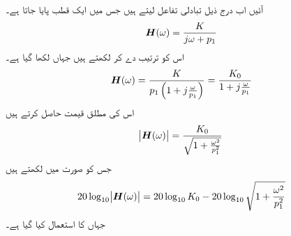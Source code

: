 آئیں اب درج ذیل تبادلی تفاعل لیتے ہیں جس میں ایک قطب پایا جاتا ہے۔
\begin{align}
{\ensuremath{{\boldsymbol{H}}}}(\omega)=\frac{K}{j\omega +p_1}
\end{align}
اس کو ترتیب دے کر لکھتے ہیں جہاں  لکھا گیا ہے۔
\begin{align}\label{مساوات_تعددی_ایک_قطب_الف}
{\ensuremath{{\boldsymbol{H}}}}(\omega)=\frac{K}{p_1\left(1+j\frac{\omega}{p_1}\right)}=\frac{K_0}{1+j\frac{\omega}{p_1}}
\end{align}
اس کی مطلق قیمت حاصل کرتے ہیں
\begin{align}
\abs{{{\boldsymbol{H}}}(\omega)}=\frac{K_0}{\sqrt{1+\frac{\omega^2}{p^2_1}}}
\end{align}
جس کو  صورت میں لکھتے ہیں
\begin{align}\label{مساوات_تعددی_ایک_قطب_ب}
20\log_{10}\abs{{{\boldsymbol{H}}}(\omega)}=20 \log_{10}K_0 -20\log_{10}\sqrt{1+\frac{\omega^2}{p^2_1}}
\end{align}
 جہاں  کا استعمال کیا گیا ہے۔

